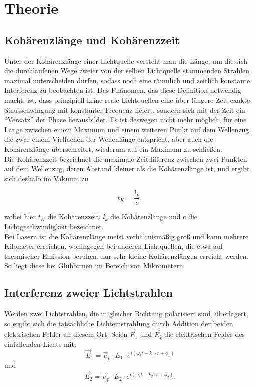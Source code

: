 \section{Theorie}

\subsection{Kohärenzlänge und Kohärenzzeit}
Unter der Kohärenzlänge einer Lichtquelle versteht man die Länge, um die sich die durchlaufenen Wege zweier von der 
selben Lichtquelle stammenden Strahlen maximal unterscheiden dürfen, sodass noch eine räumlich und zeitlich konstante 
Interferenz zu beobachten ist. Das Phänomen, das diese Definition notwendig macht, ist, dass prinzipiell keine reale Lichtquellen eine über längere Zeit exakte 
Sinusschwingung mit konstanter Frequenz liefert, sondern sich mit der Zeit ein \enquote{Versatz} der Phase herausbildet. Es ist deswegen nicht 
mehr möglich, für eine Länge zwischen einem Maximum und einem weiteren Punkt auf dem Wellenzug, die zwar einem 
Vielfachen der Wellenlänge entspricht, aber auch die Kohärenzlänge überschreitet, wiederum auf ein Maximum zu schließen. \\
Die Kohärenzzeit bezeichnet die maximale Zeitdifferenz zwischen zwei Punkten auf dem Wellenzug, deren Abstand kleiner 
als die Kohärenzlänge ist, und ergibt sich deshalb im Vakuum zu 

\begin{equation}
t_{K} = \frac{l_{k}}{c},
\end{equation}

wobei hier $ t_{K} $ die Kohärenzzeit, $ l_{k} $ die Kohärenzlänge und c die Lichtgeschwindigkeit bezeichnet. \\
Bei Lasern ist die Kohärenzlänge meist verhältnismäßig groß und kann mehrere Kilometer erreichen, wohingegen bei anderen Lichtquellen, die etwa auf thermischer Emission beruhen, nur sehr kleine Kohärenzlängen erreicht werden. So liegt diese bei Glühbirnen im Bereich von Mikrometern. 

\subsection{Interferenz zweier Lichtstrahlen}
Werden zwei Lichtstrahlen, die in gleicher Richtung polarisiert sind, überlagert, so ergibt sich die tatsächliche Lichteinstrahlung durch Addition der beiden elektrischen Felder an diesem Ort. 
Seien $ \vec{E}_{1} $ und $ \vec{E}_{2} $ die elektrischen Felder des einfallenden Lichts mit: 
\begin{equation}
\vec{E}_{1} = \vec{e}_{p} \cdot E_{1} \cdot e^{i(\omega_{1}t - k_{1} \cdot r + \phi_{1})}
\end{equation} und 
\begin{equation}
\vec{E}_{2} = \vec{e}_{p} \cdot E_{2} \cdot e^{i(\omega_{2}t - k_{2} \cdot r + \phi_{2})}.
\end{equation}

